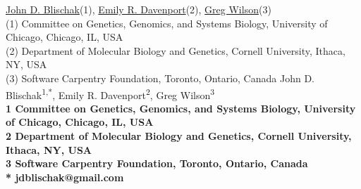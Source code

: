 

\iflatexml
  \href{https://www.authorea.com/users/5990}{John D. Blischak}(1), \href{https://www.authorea.com/users/16152}{Emily R. Davenport}(2), \href{https://www.authorea.com/users/18131}{Greg Wilson}(3)\\

  (1) Committee on Genetics, Genomics, and Systems Biology, University of Chicago, Chicago, IL, USA\\
  (2) Department of Molecular Biology and Genetics, Cornell University, Ithaca, NY, USA\\
  (3) Software Carpentry Foundation, Toronto, Ontario, Canada
\else
  John D. Blischak\textsuperscript{1,*},
  Emily R. Davenport\textsuperscript{2},
  Greg Wilson\textsuperscript{3}
  \\
  \bigskip
  \bf{1} Committee on Genetics, Genomics, and Systems Biology, University of Chicago, Chicago, IL, USA
  \\
  \bf{2} Department of Molecular Biology and Genetics, Cornell University, Ithaca, NY, USA
  \\
  \bf{3} Software Carpentry Foundation, Toronto, Ontario, Canada
  \\
  \bigskip
  * jdblischak@gmail.com
